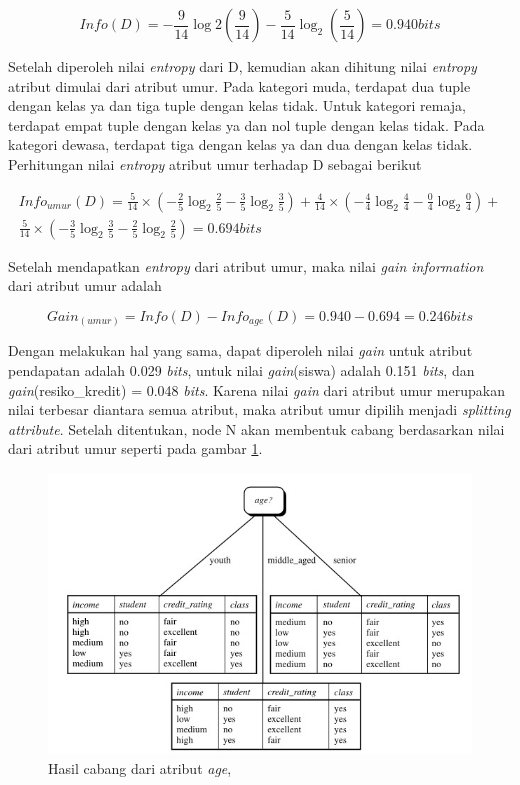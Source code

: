 \begin{displaymath}
	Info(D) = - \frac{9}{14}\log2(\frac{9}{14}) - \frac{5}{14}\log_2(\frac{5}{14}) = 0.940 bits
\end{displaymath}

Setelah diperoleh nilai \textsl{entropy} dari D, kemudian akan dihitung nilai \textsl{entropy} atribut dimulai dari atribut umur. Pada kategori muda, terdapat dua tuple dengan kelas ya dan tiga tuple dengan kelas tidak. Untuk kategori remaja, terdapat empat tuple dengan kelas ya dan nol tuple dengan kelas tidak. Pada kategori dewasa, terdapat tiga dengan kelas ya dan dua dengan kelas tidak. Perhitungan nilai \textsl{entropy} atribut umur terhadap D sebagai berikut

\begin{align*}
	Info_{umur}(D) = \frac{5}{14} \times (-\frac{2}{5}\log_2\frac{2}{5} - \frac{3}{5}\log_2\frac{3}{5}) + \frac{4}{14} \times (-\frac{4}{4}\log_2\frac{4}{4} - \frac{0}{4}\log_2\frac{0}{4}) + \\
	\frac{5}{14} \times (-\frac{3}{5}\log_2\frac{3}{5} - \frac{2}{5}\log_2\frac{2}{5}) = 0.694 bits
\end{align*}

Setelah mendapatkan \textsl{entropy} dari atribut umur, maka nilai \textsl{gain information} dari atribut umur adalah

\begin{displaymath}
	Gain_{(umur)} = Info(D) - Info_{age}(D) = 0.940 - 0.694 = 0.246 bits
\end{displaymath}

Dengan melakukan hal yang sama, dapat diperoleh nilai \textsl{gain} untuk atribut pendapatan adalah 0.029 \textsl{bits}, untuk nilai \textsl{gain}(siswa) adalah 0.151 \textsl{bits}, dan \textsl{gain}(resiko\_kredit) = 0.048 \textsl{bits}. Karena nilai \textsl{gain} dari atribut umur merupakan nilai terbesar diantara semua atribut, maka atribut umur dipilih menjadi \textsl{splitting attribute}. Setelah ditentukan, node N akan membentuk cabang berdasarkan nilai dari atribut umur seperti pada gambar \ref{fig:hasilCabang}.

\begin{figure}
\includegraphics[scale=1]{Gambar/hasilcabangid3.jpg}
\caption[Hasil pohon faktor pada atribut \textsl{age} dari table 2.1]{Hasil cabang dari atribut \textsl{age}, \cite{DM}} 
\label{fig:hasilCabang}
\end{figure}

